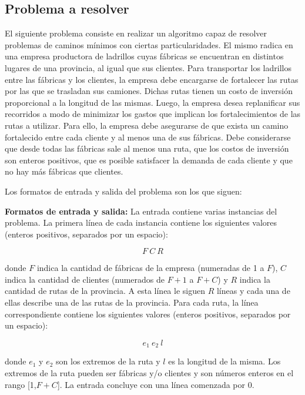 \subsection{Problema a resolver}
El siguiente problema consiste en realizar un algoritmo capaz de resolver problemas de caminos mínimos con ciertas particularidades. El mismo radica en una empresa productora de ladrillos cuyas fábricas se encuentran en distintos lugares de una provincia, al igual que sus clientes. Para transportar los ladrillos entre las fábricas y los clientes, la empresa debe encargarse de fortalecer las rutas por las que se trasladan sus camiones. Dichas rutas tienen un costo de inversión proporcional a la longitud de las mismas. Luego, la empresa desea replanificar sus recorridos a modo de minimizar los gastos que implican los fortalecimientos de las rutas a utilizar. Para ello, la empresa debe asegurarse de que exista un camino fortalecido entre cada cliente y al menos una de sus fábricas. Debe considerarse que desde todas las fábricas sale al menos una ruta, que los costos de inversión son enteros positivos, que es posible satisfacer la demanda de cada cliente y que no hay más fábricas que clientes.

Los formatos de entrada y salida del problema son los que siguen:\newline


\textbf {Formatos de entrada y salida:}\newline
\newline
La entrada contiene varias instancias del problema. La primera línea de cada instancia contiene los siguientes valores (enteros positivos, separados por un espacio):

$$F\ C\ R$$

donde \textbf{$F$} indica la cantidad de fábricas de la empresa (numeradas de 1 a \textbf{$F$}), \textbf{$C$} indica la cantidad de clientes (numerados de \textbf{$F+1$} a \textbf{$F+C$}) y \textbf{$R$} indica la cantidad de rutas de la provincia. A esta línea le siguen \textbf{$R$} líneas y cada una de ellas describe una de las rutas de la provincia. Para cada ruta, la línea correspondiente contiene los siguientes valores (enteros positivos, separados por un espacio):

$$e_{1}\ e_{2}\ l$$

donde \textbf{$e_{1}$} y \textbf{$e_{2}$} son los extremos de la ruta y \textbf{$l$} es la longitud de la misma. Los extremos de la ruta pueden ser fábricas y/o clientes y son números enteros en el rango [1,\textbf{$F+C$}]. La entrada concluye con una línea comenzada por 0.\newline

